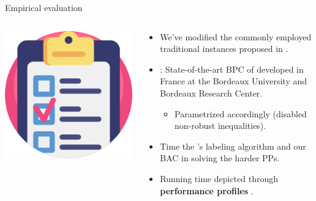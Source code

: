 \begin{frame}{Empirical evaluation}
	\begin{columns}
		\begin{column}{0.2\textwidth}
			\centering
			\includegraphics[width=\textwidth]{./Imgs/testing.png}
		\end{column}
		\begin{column}{0.8\textwidth}
			\begin{itemize}
				\item We've modified the commonly employed traditional instances proposed in
				      \cite{dantzig1959, christofides1969, gaskell1967bases, gillett1974heuristic,christofides1979vehicle,fisher1994,augerat1995}.
				\item \bapcod{}: State-of-the-art BPC of \cite{sadykov2021bucket} developed in France at the Bordeaux University and Bordeaux Research Center.
				      \begin{itemize}
					      \item Parametrized accordingly (disabled non-robust inequalities).
				      \end{itemize}
				\item Time the \bapcod{}'s labeling algorithm \cite{pessoa2020generic} and our BAC in solving the harder PPs.
				\item Running time depicted through \textbf{performance profiles} \parencite{dolan2002}.
			\end{itemize}
		\end{column}
	\end{columns}
\end{frame}

